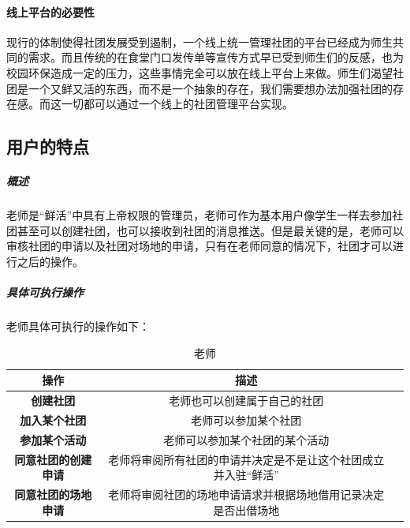 \documentclass[UTF8]{ctexart}
\begin{document}
\paragraph{线上平台的必要性}
现行的体制使得社团发展受到遏制，一个线上统一管理社团的平台已经成为师生共同的需求。而且传统的在食堂门口发传单等宣传方式早已受到师生们的反感，也为校园环保造成一定的压力，这些事情完全可以放在线上平台上来做。师生们渴望社团是一个又鲜又活的东西，而不是一个抽象的存在，我们需要想办法加强社团的存在感。而这一切都可以通过一个线上的社团管理平台实现。

\subsection{用户的特点}
\subparagraph{概述}
老师是“鲜活”中具有上帝权限的管理员，老师可作为基本用户像学生一样去参加社团甚至可以创建社团，也可以接收到社团的消息推送。但是最关键的是，老师可以审核社团的申请以及社团对场地的申请，只有在老师同意的情况下，社团才可以进行之后的操作。
\subparagraph{具体可执行操作}
老师具体可执行的操作如下：
\newline
\newline
\begin{table}[H]
\centering
\caption{老师}
\begin{tabular}{ccc}
\toprule
操作& 描述\\
\midrule
\textbf{创建社团}& 老师也可以创建属于自己的社团\\
\textbf{加入某个社团}& 老师可以参加某个社团\\
\textbf{参加某个活动}&老师可以参加某个社团的某个活动\\
\textbf{同意社团的创建申请}&老师将审阅所有社团的申请并决定是不是让这个社团成立并入驻“鲜活”\\
\textbf{同意社团的场地申请}&老师将审阅社团的场地申请请求并根据场地借用记录决定是否出借场地\\
\bottomrule
\end{tabular}
\end{table}
\end{document}

